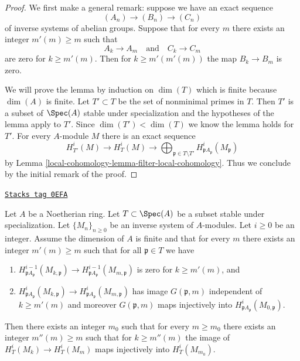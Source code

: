 \begin{proof}
We first make a general remark: suppose we have an exact
sequence
$$
(A_n) \to (B_n) \to (C_n)
$$
of inverse systems of abelian groups. Suppose that for every
$m$ there exists an integer $m'(m) \geq m$ such that
$$
A_k \to A_m
\quad\text{and}\quad
C_k \to C_m
$$
are zero for $k \geq m'(m)$. Then for $k \geq m'(m'(m))$
the map $B_k \to B_m$ is zero.

\medskip\noindent
We will prove the lemma by induction on $\dim(T)$ which is
finite because $\dim(A)$ is finite. Let $T' \subset T$ be
the set of nonminimal primes in $T$. Then $T'$
is a subset of $\Spec(A)$ stable under specialization
and the hypotheses of the lemma apply to $T'$.
Since $\dim(T') < \dim(T)$ we know the lemma holds for $T'$.
For every $A$-module $M$ there is an exact sequence
$$
H^i_{T'}(M) \to H^i_T(M) \to
\bigoplus\nolimits_{\mathfrak p \in T \setminus T'}
H^i_{\mathfrak p A_\mathfrak p}(M_\mathfrak p)
$$
by Lemma \ref{local-cohomology-lemma-filter-local-cohomology}.
Thus we conclude by the initial remark of the proof.
\end{proof}

\begin{lemma}
\label{local-cohomology-lemma-essential-image}
\href{https://stacks.math.columbia.edu/tag/0EFA}{\texttt{Stacks tag 0EFA}}

Let $A$ be a Noetherian ring. Let $T \subset \Spec(A)$ be a subset
stable under specialization. Let $\{M_n\}_{n \geq 0}$ be an inverse system
of $A$-modules. Let $i \geq 0$ be an integer. Assume the dimension of $A$
is finite and that for every $m$ there exists an integer $m'(m) \geq m$
such that for all $\mathfrak p \in T$ we have
\begin{enumerate}
\item $H^{i - 1}_{\mathfrak p A_\mathfrak p}(M_{k, \mathfrak p})
\to H^{i - 1}_{\mathfrak p A_\mathfrak p}(M_{m, \mathfrak p})$
is zero for $k \geq m'(m)$, and
\item $ H^i_{\mathfrak p A_\mathfrak p}(M_{k, \mathfrak p}) \to
H^i_{\mathfrak p A_\mathfrak p}(M_{m, \mathfrak p})$
has image $G(\mathfrak p, m)$ independent of $k \geq m'(m)$ and moreover
$G(\mathfrak p, m)$ maps injectively into
$H^i_{\mathfrak p A_\mathfrak p}(M_{0, \mathfrak p})$.
\end{enumerate}
Then there exists an integer $m_0$ such that for every $m \geq m_0$
there exists an integer $m''(m) \geq m$ such that
for $k \geq m''(m)$ the image of $H^i_T(M_k) \to H^i_T(M_m)$
maps injectively into $H^i_T(M_{m_0})$.
\end{lemma}

